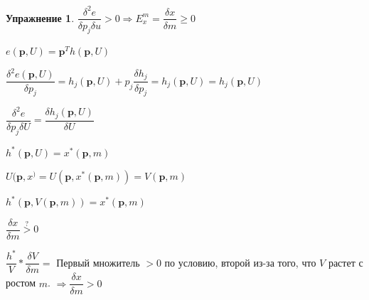 \documentclass[reqno]{article}
\theoremstyle{definition}
\theoremstyle{definition}
\theoremstyle{definition}
\theoremstyle{definition}
\theoremstyle{definition}
\newtheorem{exc}{Упражнение}[section]
\theoremstyle{definition}
\theoremstyle{definition}
\theoremstyle{definition}
\theoremstyle{definition}
\begin{document}
	\begin{exc}
		$\dfrac{\delta^2 e}{\delta p_j \delta u} > 0 \Rightarrow E_x^m = \dfrac{\delta x}{\delta m} \geq 0$
		
		$e(\textbf{p},U)=\textbf{p}^T h(\textbf{p},U)$
		
		$\dfrac{\delta^2 e(\textbf{p},U)}{\delta p_j} = h_j(\textbf{p},U) + p_j \dfrac{\delta h_j}{\delta p_j} = h_j(\textbf{p},U) = h_j(\textbf{p},U)$
		
		$\dfrac{\delta^2 e}{\delta p_j \delta U} = \dfrac{\delta h_j(\textbf{p},U)}{\delta U}$
		
		$h^* (\textbf{p},U) = x^*(\textbf{p},m)$
		
		$U(\textbf{p},x^)=U(\textbf{p},x^*(\textbf{p},m))=V(\textbf{p},m)$
		
		$h^*(\textbf{p},V(\textbf{p},m))=x^*(\textbf{p},m)$
		
		$\dfrac{\delta x}{\delta m} \stackrel{?}{>} 0$
		
		$\dfrac{h^*}{V} * \dfrac{\delta V}{\delta m} =$ Первый множитель $>0$ по условию, второй из-за того, что $V$ растет с ростом $m$. $\Rightarrow \dfrac{\delta x}{\delta m} > 0$
		
	\end{exc}
\end{document}
